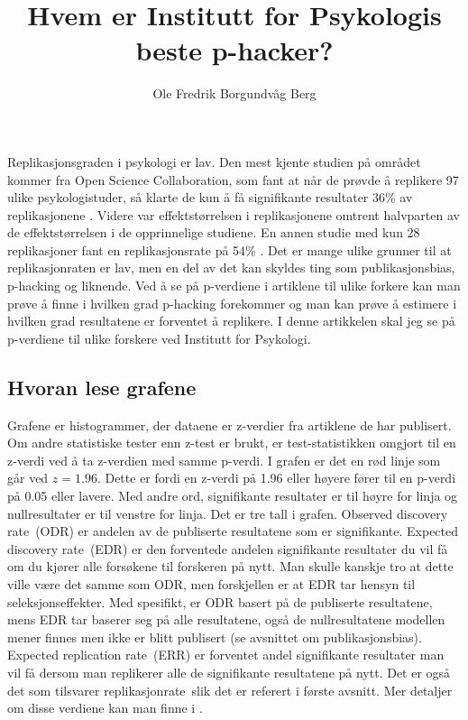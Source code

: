 \documentclass[doc,norsk]{apa7}
\title{Hvem er Institutt for Psykologis beste p-hacker?}
\author{Ole Fredrik Borgundvåg Berg}
\affiliation{NTNU}
\begin{document}
\maketitle

Replikasjonsgraden i psykologi er lav. Den mest kjente studien på området kommer fra Open Science Collaboration, som fant at når de prøvde å replikere 97 ulike psykologistuder, så klarte de kun å få signifikante resultater 36\% av replikasjonene \parencite{open-replikasjon}. Videre var effektstørrelsen i replikasjonene omtrent halvparten av de effektstørrelsen i de opprinnelige studiene. En annen studie med kun 28 replikasjoner fant en replikasjonsrate på 54\% \parencite{replikasjonsrate-2}. Det er mange ulike grunner til at replikasjonraten er lav, men en del av det kan skyldes ting som publikasjonsbias, p-hacking og liknende. Ved å se på p-verdiene i artiklene til ulike forkere kan man prøve å finne i hvilken grad p-hacking forekommer og man kan prøve å estimere i hvilken grad resultatene er forventet å replikere. I denne artikkelen skal jeg se på p-verdiene til ulike forskere ved Institutt for Psykologi. 

\subsection{Hvoran lese grafene}
Grafene er histogrammer, der dataene er z-verdier fra artiklene de har publisert. Om andre statistiske tester enn z-test er brukt, er test-statistikken omgjort til en z-verdi ved å ta z-verdien med samme p-verdi. I grafen er det en rød linje som går ved $z=1.96$. Dette er fordi en z-verdi på 1.96 eller høyere fører til en p-verdi på 0.05 eller lavere. Med andre ord, signifikante resultater er til høyre for linja og nullresultater er til venstre for linja. Det er tre tall i grafen. \guillemetleft Observed discovery rate\guillemetright\ (ODR) er andelen av de publiserte resultatene som er signifikante. \guillemetleft Expected discovery rate\guillemetright\ (EDR) er den forventede andelen signifikante resultater du vil få om du kjører alle forsøkene til forskeren på nytt. Man skulle kanskje tro at dette ville være det samme som ODR, men forskjellen er at EDR tar hensyn til seleksjonseffekter. Med spesifikt, er ODR basert på de publiserte resultatene, mens EDR tar baserer seg på alle resultatene, også de nullresultatene modellen mener finnes men ikke er blitt publisert (se avsnittet om publikasjonsbias). \guillemotleft Expected replication rate\guillemetright\ (ERR) er forventet andel signifikante resultater man vil få dersom man replikerer alle de signifikante resultatene på nytt. Det er også det som tilsvarer \guillemetleft replikasjonrate\guillemetright\ slik det er referert i første avsnitt. Mer detaljer om disse verdiene kan man finne i \textcite{z-curve-implementasjon}.
\end{document}
